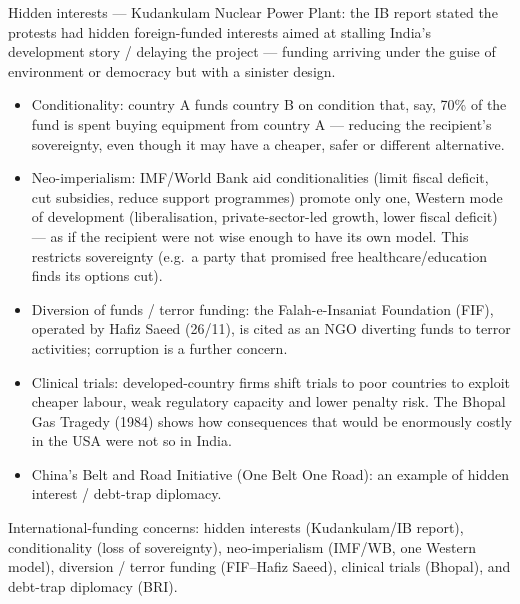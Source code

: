 \begin{ExampleBox}
Hidden interests --- Kudankulam Nuclear Power Plant: the IB report stated the protests had hidden foreign-funded interests aimed at stalling India's development story / delaying the project --- funding arriving under the guise of environment or democracy but with a sinister design.
\end{ExampleBox}

\begin{CriticalPoint}
\begin{itemize}
\item Conditionality: country A funds country B on condition that, say, 70\% of the fund is spent buying equipment from country A --- reducing the recipient's sovereignty, even though it may have a cheaper, safer or different alternative.
\item Neo-imperialism: IMF/World Bank aid conditionalities (limit fiscal deficit, cut subsidies, reduce support programmes) promote only one, Western mode of development (liberalisation, private-sector-led growth, lower fiscal deficit) --- as if the recipient were not wise enough to have its own model. This restricts sovereignty (e.g.\ a party that promised free healthcare/education finds its options cut).
\end{itemize}
\end{CriticalPoint}

\begin{ExampleBox}
\begin{itemize}
\item Diversion of funds / terror funding: the Falah-e-Insaniat Foundation (FIF), operated by Hafiz Saeed (26/11), is cited as an NGO diverting funds to terror activities; corruption is a further concern.
\item Clinical trials: developed-country firms shift trials to poor countries to exploit cheaper labour, weak regulatory capacity and lower penalty risk. The Bhopal Gas Tragedy (1984) shows how consequences that would be enormously costly in the USA were not so in India.
\item China's Belt and Road Initiative (One Belt One Road): an example of hidden interest / debt-trap diplomacy.
\end{itemize}
\end{ExampleBox}

\begin{QuickRevision}
International-funding concerns: hidden interests (Kudankulam/IB report), conditionality (loss of sovereignty), neo-imperialism (IMF/WB, one Western model), diversion / terror funding (FIF--Hafiz Saeed), clinical trials (Bhopal), and debt-trap diplomacy (BRI).
\end{QuickRevision}


